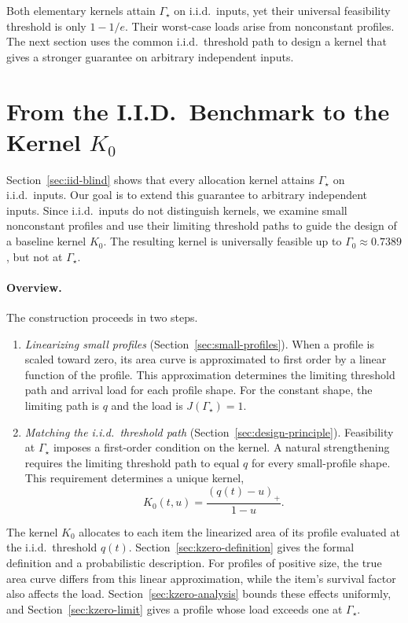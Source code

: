 \documentclass[11pt]{article}
\theoremstyle{definition}
\theoremstyle{remark}
\begin{document}
Both elementary kernels attain $\Gamma_\star$ on i.i.d.\ inputs,
yet their universal feasibility threshold is only $1-1/e$.
Their worst-case loads arise from nonconstant profiles.
The next section uses the common i.i.d.\ threshold path to design a
kernel that gives a stronger guarantee on arbitrary independent inputs.

\section{From the I.I.D.\ Benchmark to the Kernel \texorpdfstring{$K_0$}{K0}}\label{sec:k0}

Section~\ref{sec:iid-blind} shows that every allocation kernel attains
$\Gamma_\star$ on i.i.d.\ inputs.  Our goal is to extend this guarantee
to arbitrary independent inputs.  Since i.i.d.\ inputs do not distinguish
kernels, we examine small nonconstant profiles and use their limiting
threshold paths to guide the design of a baseline kernel $K_0$.
The resulting kernel is universally feasible up to
$\Gamma_0\approx0.7389$, but not at $\Gamma_\star$.

\paragraph{Overview.}
The construction proceeds in two steps.
\begin{enumerate}
\item \emph{Linearizing small profiles}
(Section~\ref{sec:small-profiles}).
When a profile is scaled toward zero, its area curve is approximated
to first order by a linear function of the profile.
This approximation determines the limiting threshold path and arrival
load for each profile shape.
For the constant shape, the limiting path is $q$ and the load is
$J(\Gamma_\star)=1$.
\item \emph{Matching the i.i.d.\ threshold path}
(Section~\ref{sec:design-principle}).
Feasibility at $\Gamma_\star$ imposes a first-order condition on the
kernel.  A natural strengthening requires the limiting threshold path
to equal $q$ for every small-profile shape.
This requirement determines a unique kernel,
\[
 K_0(t,u)=\frac{(q(t)-u)_+}{1-u}.
\]
\end{enumerate}
The kernel $K_0$ allocates to each item the linearized area of its
profile evaluated at the i.i.d.\ threshold $q(t)$.
Section~\ref{sec:kzero-definition} gives the formal definition and a
probabilistic description.
For profiles of positive size, the true area curve differs from this
linear approximation, while the item's survival factor also affects
the load.  Section~\ref{sec:kzero-analysis} bounds these effects
uniformly, and Section~\ref{sec:kzero-limit} gives a profile whose load
exceeds one at $\Gamma_\star$.
\end{document}
